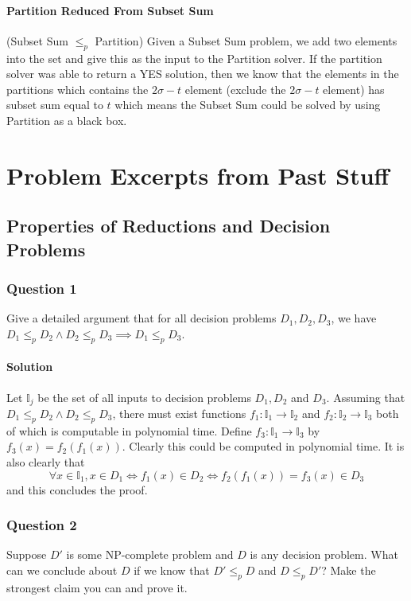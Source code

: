 \documentclass[10pt]{article}
\begin{document}
\paragraph{Partition Reduced From Subset Sum} (Subset Sum $\leq_p$ Partition) Given a Subset Sum problem, we add two elements into the set and give this as the input to the Partition solver. If the partition solver was able to return a YES solution, then we know that the elements in the partitions which 
contains the $2\sigma - t$ element (exclude the $2\sigma - t$ element) has subset sum equal to $t$ which means the Subset Sum could be solved by using Partition as a black box. 

\newpage
\section{Problem Excerpts from Past Stuff}
\subsection{Properties of Reductions and Decision Problems}
\subsubsection{Question 1} Give a detailed argument that for all decision problems $D_1,D_2,D_3$, we have $D_1 \leq_p D_2 \wedge D_2 \leq_p D_3\implies D_1 \leq_p D_3$. 
\paragraph{Solution} Let $\mathbb{I}_j$ be the set of all inputs to decision problems $D_1, D_2$ and $D_3$. Assuming that $D_1 \leq_p D_2 \wedge D_2 \leq_p D_3$, there must exist functions $f_1: \mathbb{I}_1 \rightarrow \mathbb{I}_2$ and $f_2:  \mathbb{I}_2 \rightarrow \mathbb{I}_3$ both of which is computable in polynomial time. Define $f_3: \mathbb{I}_1 \rightarrow \mathbb{I}_3$ by $f_3(x) = f_2(f_1(x))$. Clearly this could be computed in polynomial time. It is also clearly that
\begin{equation*}
    \forall x \in \mathbb{I}_{1}, x \in D_{1} \Leftrightarrow f_{1}(x) \in D_{2} \Leftrightarrow f_{2}\left(f_{1}(x)\right)=f_{3}(x) \in D_{3}
\end{equation*}
and this concludes the proof. 



\subsubsection{Question 2} Suppose $D′$ is some NP-complete problem and $D$ is any decision problem. What can we conclude about $D$ if we know that $D′\leq_p D$ and $D\leq_p D′$? Make the strongest claim you can and prove it. 
\end{document}
